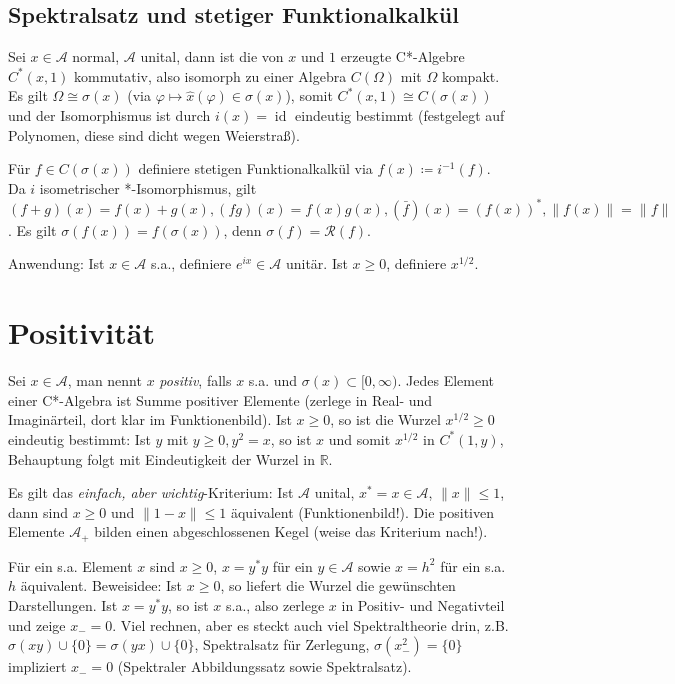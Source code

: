 \documentclass[11pt,a4paper]{scrartcl}
\newcommand{\R}{\mathbb{R}} %
\newcommand{\A}{\mathcal{A}}
\newcommand{\Rc}{\mathcal{R}}
\theoremstyle{plain}
\theoremstyle{definition}
\theoremstyle{remark}
\DeclareMathOperator{\id}{id}
\begin{document}
\subsection{Spektralsatz und stetiger Funktionalkalkül}

Sei $x\in \A$ normal, $\A$ unital, dann ist die von $x$ und $1$ erzeugte C*-Algebre $C^*(x,1)$ kommutativ, also isomorph zu einer Algebra $C(\Omega)$ mit $\Omega$ kompakt. Es gilt $\Omega \cong \sigma(x)$ (via $\varphi \mapsto \hat x(\varphi) \in \sigma(x)$), somit $C^*(x,1)\cong C(\sigma(x))$ und der Isomorphismus ist durch $i(x)=\id$ eindeutig bestimmt (festgelegt auf Polynomen, diese sind dicht wegen Weierstraß).

Für $f\in C(\sigma(x))$ definiere stetigen Funktionalkalkül via $f(x) \coloneqq i^{-1}(f)$. Da $i$ isometrischer *-Isomorphismus, gilt $(f+g)(x)=f(x)+g(x), (fg)(x)=f(x)g(x), (\bar f)(x)=(f(x))^*, \|f(x)\|=\|f\|$. Es gilt $\sigma(f(x))=f(\sigma(x))$, denn $\sigma(f)=\Rc(f)$.

Anwendung: Ist $x\in \A$ s.a., definiere $e^{ix}\in \A$ unitär. Ist $x \geq 0$, definiere $x^{1/2}$.

\section{Positivität}

Sei $x\in \A$, man nennt $x$ \emph{positiv}, falls $x$ s.a. und $\sigma(x) \subset [0,\infty)$. Jedes Element einer C*-Algebra ist Summe positiver Elemente (zerlege in Real- und Imaginärteil, dort klar im Funktionenbild). Ist $x \geq 0$, so ist die Wurzel $x^{1/2} \geq 0$ eindeutig bestimmt: Ist $y$ mit $y \geq 0, y^2=x$, so ist $x$ und somit $x^{1/2}$ in $C^*(1,y)$, Behauptung folgt mit Eindeutigkeit der Wurzel in $\R$.

Es gilt das \emph{einfach, aber wichtig}-Kriterium: Ist $\A$ unital, $x^*=x\in \A$, $\|x\| \leq 1$, dann sind $x\geq 0$ und $\|1-x\|\leq 1$ äquivalent (Funktionenbild!). Die positiven Elemente $\A_+$ bilden einen abgeschlossenen Kegel (weise das Kriterium nach!).

Für ein s.a. Element $x$ sind $x\geq 0$, $x=y^*y$ für ein $y\in \A$ sowie $x=h^2$ für ein s.a. $h$ äquivalent. Beweisidee: Ist $x \geq 0$, so liefert die Wurzel die gewünschten Darstellungen. Ist $x=y^*y$, so ist $x$ s.a., also zerlege $x$ in Positiv- und Negativteil und zeige $x_-=0$. Viel rechnen, aber es steckt auch viel Spektraltheorie drin, z.B. $\sigma(xy) \cup \{0\} = \sigma(yx) \cup \{0 \}$, Spektralsatz für Zerlegung, $\sigma(x_-^2)=\{0\}$ impliziert $x_-=0$ (Spektraler Abbildungssatz sowie Spektralsatz).
\end{document}
